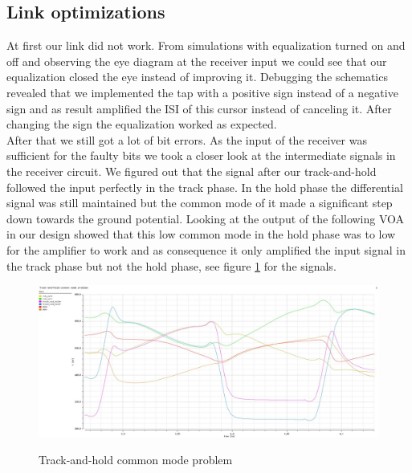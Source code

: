 \subsection{Link optimizations}
\label{sec:link_opt}
At first our link did not work. From simulations with equalization turned on and off and observing the eye diagram at the receiver input we could see that our equalization closed the eye instead of improving it. Debugging the schematics revealed that we implemented the tap with a positive sign instead of a negative sign and as result amplified the ISI of this cursor instead of canceling it. After changing the sign the equalization worked as expected.\\
After that we still got a lot of bit errors. As the input of the receiver was sufficient for the faulty bits we took a closer look at the intermediate signals in the receiver circuit. We figured out that the signal after our track-and-hold followed the input perfectly in the track phase. In the hold phase the differential signal was still maintained but the common mode of it made a significant step down towards the ground potential. Looking at the output of the following VOA in our design showed that this low common mode in the hold phase was to low for the amplifier to work and as consequence it only amplified the input signal in the track phase but not the hold phase, see figure \ref{fig:track_and_hold_problem} for the signals.

\begin{figure}[H]
  \centering
  {\includegraphics[scale=0.4]{img/track_and_hold_problem.jpg}}
  \caption{Track-and-hold common mode problem}
  \label{fig:track_and_hold_problem}
\end{figure}

